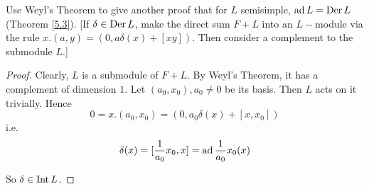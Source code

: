 \begin{ex}
  Use Weyl's Theorem to give another proof that for $L$ semisimple, $\operatorname{ad} L = \operatorname{Der} L$ (Theorem \ref{5.3}). [If $\delta \in \operatorname{Der} L$, make the direct sum $F+L$ into an $L-$module via the rule $x.(a,y) = (0, a\delta(x)+[xy])$. Then consider a complement to the submodule $L$.]
\end{ex}
\begin{proof}
  Clearly, $L$ is a submodule of $F + L$. By Weyl's Theorem, it has a complement of dimension $1$. Let $(a_0, x_0), a_0 \neq 0$ be its basis. Then $L$ acts on it trivially. Hence
  \begin{equation*}
    0 = x.(a_0, x_0) = (0, a_0\delta(x) + [x, x_0])
  \end{equation*}
  i.e.
  \begin{equation*}
    \delta(x) = [\frac{1}{a_0}x_0, x] = \operatorname{ad}\frac{1}{a_0}x_0(x)
  \end{equation*}

  So $\delta \in \operatorname{Int} L$.
\end{proof}

